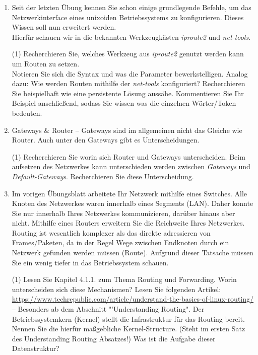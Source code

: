 \documentclass[paper=a4,fontsize=11pt]{scrartcl}%
\numberwithin{equation}{section}
\begin{document}
\begin{enumerate}
	\item Seit der letzten Übung kennen Sie schon einige grundlegende Befehle, um das Netzwerkinterface eines unixoiden Betriebssystems zu konfigurieren. Dieses Wissen soll nun erweitert werden.\\
	Hierfür schauen wir in die bekannten Werkzeugkästen \emph{iproute2} und \emph{net-tools}.
	\begin{tasks}(1)
		\task Recherchieren Sie, welches Werkzeug aus \emph{iproute2} genutzt werden kann um Routen zu setzen.\\
		Notieren Sie sich die Syntax und was die Parameter bewerkstelligen.
		\task Analog dazu: Wie werden Routen mithilfe der \emph{net-tools} konfiguriert?
		\task Recherchieren Sie beispielhaft wie eine persistente Lösung aussähe. Kommentieren Sie 
		Ihr Beispiel anschließend, sodass Sie wissen was die einzelnen Wörter/Token bedeuten.
	\end{tasks}
	\item Gateways \& Router -- Gateways sind im allgemeinen nicht das Gleiche wie Router. Auch unter den Gateways gibt es Unterscheidungen.
	\begin{tasks}(1)
		\task Recherchieren Sie worin sich Router und Gateways unterscheiden.
		\task Beim aufsetzen des Netzwerkes kann unterschieden werden zwischen \emph{Gateways} und \emph{Default-Gateways}. Recherchieren Sie diese Unterscheidung.
	\end{tasks}
	\item Im vorigen Übungsblatt arbeitete Ihr Netzwerk mithilfe eines Switches. Alle Knoten des Netzwerkes waren innerhalb eines Segments (LAN). Daher konnte Sie nur innerhalb Ihres Netzwerkes kommunizieren, darüber hinaus aber nicht. Mithilfe eines Routers erweitern Sie die Reichweite Ihres Netzwerkes.\\ 
	Routing ist wesentlich komplexer als das direkte adressieren von Frames/Paketen, da in der Regel Wege zwischen Endknoten durch ein Netzwerk gefunden werden müssen (Route). Aufgrund dieser Tatsache müssen Sie ein wenig tiefer in das Betriebssystem schauen.
	\begin{tasks}(1)
	\task Lesen Sie Kapitel 4.1.1. \cite[S. 308ff]{Kurose2012} zum Thema Routing und Forwarding. Worin unterscheiden sich diese Mechanismen?
	\task Lesen Sie folgenden Artikel: \url{https://www.techrepublic.com/article/understand-the-basics-of-linux-routing/} -- Besonders ab dem Abschnitt "'Understanding Routing".
	\task Der Betriebssystemkern (Kernel) stellt die Infrastruktur für das Routing bereit. Nennen Sie die hierfür maßgebliche Kernel-Structure. (Steht im ersten Satz des Understanding Routing Absatzes!) Was ist die Aufgabe dieser Datenstruktur?

\end{tasks}
\end{enumerate}
\end{document}
